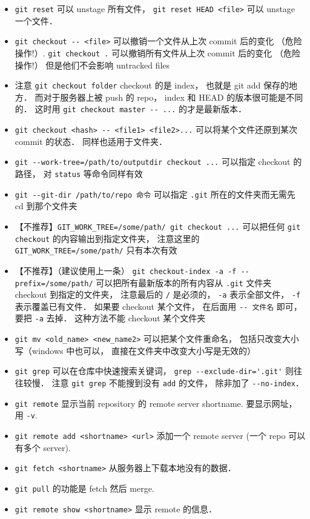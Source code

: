 \begin{itemize}
\item \verb|git reset| 可以 unstage 所有文件， \verb|git reset HEAD <file>| 可以 unstage 一个文件．
\item \verb|git checkout -- <file>| 可以撤销一个文件从上次 commit 后的变化 （危险操作!）. \verb|git checkout .| 可以撤销所有文件从上次 commit 后的变化 （危险操作!） 但是他们不会影响 untracked files
\item 注意 \verb|git checkout folder| checkout 的是 index， 也就是 git add 保存的地方． 而对于服务器上被 push 的 repo， index 和 HEAD 的版本很可能是不同的． 这时用 \verb|git checkout master -- ...| 的才是最新版本．
\item \verb|git checkout <hash> -- <file1> <file2>...| 可以将某个文件还原到某次 commit 的状态． 同样也适用于文件夹．
\item \verb|git --work-tree=/path/to/outputdir checkout ...| 可以指定 checkout 的路径， 对 \verb|status| 等命令同样有效
\item \verb|git --git-dir /path/to/repo 命令| 可以指定 \verb|.git| 所在的文件夹而无需先 cd 到那个文件夹
\item 【不推荐】\verb|GIT_WORK_TREE=/some/path/ git checkout ...| 可以把任何 \verb|git checkout| 的内容输出到指定文件夹， 注意这里的 \verb|GIT_WORK_TREE=/some/path/| 只有本次有效
\item 【不推荐】（建议使用上一条） \verb|git checkout-index -a -f --prefix=/some/path/| 可以把所有最新版本的所有内容从 \verb|.git| 文件夹 checkout 到指定的文件夹， 注意最后的 \verb|/| 是必须的， \verb|-a| 表示全部文件， \verb|-f| 表示覆盖已有文件． 如果要 checkout 某个文件， 在后面用 \verb|-- 文件名| 即可， 要把 \verb|-a| 去掉． 这种方法不能 checkout 某个文件夹
\item \verb|git mv <old_name> <new_name2>| 可以把某个文件重命名， 包括只改变大小写（windows 中也可以， 直接在文件夹中改变大小写是无效的）
\item \verb|git grep| 可以在仓库中快速搜索关键词， \verb|grep --exclude-dir='.git'| 则往往较慢． 注意 \verb|git grep| 不能搜到没有 \verb|add| 的文件， 除非加了 \verb|--no-index|．
\item \verb|git remote| 显示当前 repository 的 remote server shortname. 要显示网址， 用 \verb|-v|.
\item \verb|git remote add <shortname> <url>| 添加一个 remote server (一个 repo 可以有多个 server).
\item \verb|git fetch <shortname>| 从服务器上下载本地没有的数据．
\item \verb|git pull| 的功能是 fetch 然后 merge.
\item \verb|git remote show <shortname>| 显示 remote 的信息．

\end{itemize}
